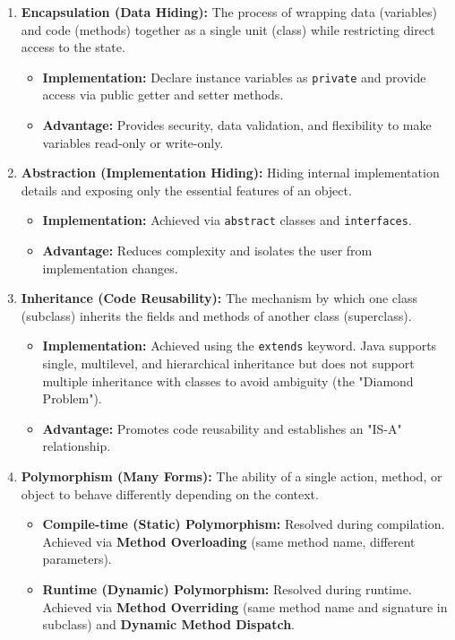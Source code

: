 \documentclass[12pt,a4paper]{article}
\begin{document}
\begin{enumerate}[leftmargin=*, itemsep=6pt]
  \item \textbf{Encapsulation (Data Hiding):}
        The process of wrapping data (variables) and code (methods) together as a single unit (class) while restricting direct access to the state.
        \begin{itemize}[leftmargin=*, label=--]
          \item \textbf{Implementation:} Declare instance variables as \texttt{private} and provide access via public getter and setter methods.
          \item \textbf{Advantage:} Provides security, data validation, and flexibility to make variables read-only or write-only.
        \end{itemize}
  \item \textbf{Abstraction (Implementation Hiding):}
        Hiding internal implementation details and exposing only the essential features of an object.
        \begin{itemize}[leftmargin=*, label=--]
          \item \textbf{Implementation:} Achieved via \texttt{abstract} classes and \texttt{interfaces}.
          \item \textbf{Advantage:} Reduces complexity and isolates the user from implementation changes.
        \end{itemize}
  \item \textbf{Inheritance (Code Reusability):}
        The mechanism by which one class (subclass) inherits the fields and methods of another class (superclass).
        \begin{itemize}[leftmargin=*, label=--]
          \item \textbf{Implementation:} Achieved using the \texttt{extends} keyword. Java supports single, multilevel, and hierarchical inheritance but does not support multiple inheritance with classes to avoid ambiguity (the "Diamond Problem").
          \item \textbf{Advantage:} Promotes code reusability and establishes an "IS-A" relationship.
        \end{itemize}
  \item \textbf{Polymorphism (Many Forms):}
        The ability of a single action, method, or object to behave differently depending on the context.
        \begin{itemize}[leftmargin=*, label=--]
          \item \textbf{Compile-time (Static) Polymorphism:} Resolved during compilation. Achieved via \textbf{Method Overloading} (same method name, different parameters).
          \item \textbf{Runtime (Dynamic) Polymorphism:} Resolved during runtime. Achieved via \textbf{Method Overriding} (same method name and signature in subclass) and \textbf{Dynamic Method Dispatch}.
        \end{itemize}
\end{enumerate}
\end{document}
